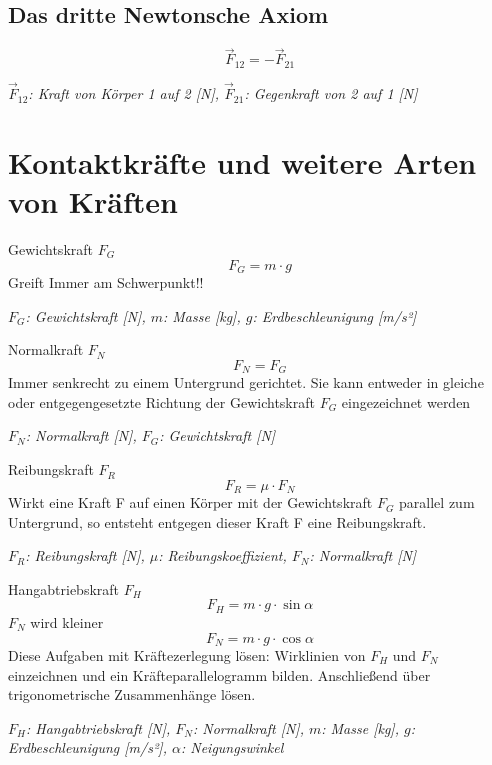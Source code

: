 \documentclass[a4paper,10pt]{article}
\newenvironment{displayformula}
{
	\begin{framed}
		\color{formulaColor}
	}
	{\end{framed}}
\newcommand{\formulalegend}[1]{%
	\par\vspace{0.5ex}%
	{{\color{legendColor}\RaggedRight\small\textit{#1}}}%
	\par\vspace{1.5ex}%
}
\begin{document}
\subsection{Das dritte Newtonsche Axiom}

\begin{displayformula}
	\[
	\vec{F}_{12} = -\vec{F}_{21}
	\]
\end{displayformula}
\formulalegend{
	\( \vec{F}_{12} \): Kraft von Körper 1 auf 2 [N], \( \vec{F}_{21} \): Gegenkraft von 2 auf 1 [N]
}



\section{Kontaktkräfte und weitere Arten von Kräften}

\begin{displayformula}
	Gewichtskraft \( F_G \)
	\[
	F_G = m \cdot g
	\]
	Greift Immer am Schwerpunkt!!
\end{displayformula}
\formulalegend{
	\( F_G \): Gewichtskraft [N], \( m \): Masse [kg], \( g \): Erdbeschleunigung [m/s²]
}

\begin{displayformula}
	Normalkraft \( F_N \) 
	\[
	F_N = F_G
	\]
	Immer senkrecht zu einem Untergrund gerichtet. Sie kann entweder in gleiche oder entgegengesetzte Richtung der Gewichtskraft $F_G$ eingezeichnet werden
\end{displayformula}
\formulalegend{
	\( F_N \): Normalkraft [N], \( F_G \): Gewichtskraft [N]
}

\begin{displayformula}
	Reibungskraft \( F_R \)
	\[
	F_R = \mu \cdot F_N
	\]
	Wirkt eine Kraft F auf einen Körper mit der Gewichtskraft $F_G$ parallel zum Untergrund, so entsteht entgegen dieser Kraft F eine Reibungskraft. 
\end{displayformula}
\formulalegend{
	\( F_R \): Reibungskraft [N], \( \mu \): Reibungskoeffizient, \( F_N \): Normalkraft [N]
}

\begin{displayformula}
	Hangabtriebskraft \( F_H \)
	\[
	F_H = m \cdot g \cdot \sin\alpha
	\]
	\( F_N \) wird kleiner
	\[
	F_N = m \cdot g \cdot \cos\alpha
	\]
	Diese Aufgaben mit Kräftezerlegung lösen: Wirklinien von $F_H$ und $F_N$ einzeichnen und ein Kräfteparallelogramm bilden. Anschließend über trigonometrische Zusammenhänge lösen.
\end{displayformula}
\formulalegend{
	\( F_H \): Hangabtriebskraft [N], \( F_N \): Normalkraft [N], \( m \): Masse [kg], \( g \): Erdbeschleunigung [m/s²], \( \alpha \): Neigungswinkel
}
\end{document}
